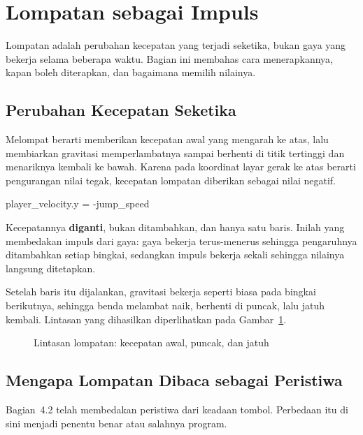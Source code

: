\section{Lompatan sebagai Impuls}
\label{sec:lompatan}

Lompatan adalah perubahan kecepatan yang terjadi seketika, bukan gaya yang
bekerja selama beberapa waktu. Bagian ini membahas cara menerapkannya, kapan
boleh diterapkan, dan bagaimana memilih nilainya.

\subsection{Perubahan Kecepatan Seketika}

Melompat berarti memberikan kecepatan awal yang mengarah ke atas, lalu
membiarkan gravitasi memperlambatnya sampai berhenti di titik tertinggi dan
menariknya kembali ke bawah. Karena pada koordinat layar gerak ke atas berarti
pengurangan nilai tegak, kecepatan lompatan diberikan sebagai nilai negatif.

\begin{kodekeluaran}
player_velocity.y = -jump_speed
\end{kodekeluaran}

Kecepatannya \textbf{diganti}, bukan ditambahkan, dan hanya
satu baris. Inilah yang membedakan impuls dari gaya: gaya bekerja terus-menerus
sehingga pengaruhnya ditambahkan setiap bingkai, sedangkan impuls bekerja
sekali sehingga nilainya langsung ditetapkan.

Setelah baris itu dijalankan, gravitasi bekerja seperti biasa pada bingkai
berikutnya, sehingga benda melambat naik, berhenti di puncak, lalu jatuh
kembali. Lintasan yang dihasilkan diperlihatkan pada
Gambar~\ref{fig:gravitasi-lompatan}.

\begin{figure}[htbp]
\centering

\caption{Lintasan lompatan: kecepatan awal, puncak, dan jatuh}
\label{fig:gravitasi-lompatan}
\end{figure}

\subsection{Mengapa Lompatan Dibaca sebagai Peristiwa}

Bagian~4.2 telah membedakan peristiwa dari keadaan tombol. Perbedaan itu di
sini menjadi penentu benar atau salahnya program.

